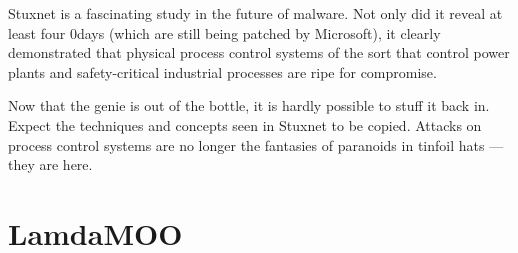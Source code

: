 \documentclass[10pt,twoside,openleft]{memoir}
\begin{document}
Stuxnet is a fascinating study in the future of malware. Not only did it reveal at least four 0days (which are still being patched by Microsoft), it clearly demonstrated that physical process control systems of the sort that control power plants and safety-critical industrial processes are ripe for compromise.

Now that the genie is out of the bottle, it is hardly possible to stuff it back in. Expect the techniques and concepts seen in Stuxnet to be copied. Attacks on process control systems are no longer the fantasies of paranoids in tinfoil hats --- they are here.


\chapter{LamdaMOO}
\end{document}
